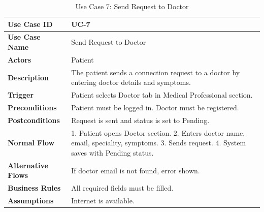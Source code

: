 \documentclass[12pt, a4paper, oneside]{report}
\begin{document}

\begin{table}[H]
\centering
\caption{Use Case 7: Send Request to Doctor}
\begin{tabularx}{\textwidth}{|l|X|}
\hline
\textbf{Use Case ID} & UC-7 \\ \hline
\textbf{Use Case Name} & Send Request to Doctor \\ \hline
\textbf{Actors} & Patient \\ \hline
\textbf{Description} & The patient sends a connection request to a doctor by entering doctor details and symptoms. \\ \hline
\textbf{Trigger} & Patient selects Doctor tab in Medical Professional section. \\ \hline
\textbf{Preconditions} & Patient must be logged in. Doctor must be registered. \\ \hline
\textbf{Postconditions} & Request is sent and status is set to Pending. \\ \hline
\textbf{Normal Flow} & 1. Patient opens Doctor section. 2. Enters doctor name, email, speciality, symptoms. 3. Sends request. 4. System saves with Pending status. \\ \hline
\textbf{Alternative Flows} & If doctor email is not found, error shown. \\ \hline
\textbf{Business Rules} & All required fields must be filled. \\ \hline
\textbf{Assumptions} & Internet is available. \\ \hline
\end{tabularx}
\end{table}
\end{document}
